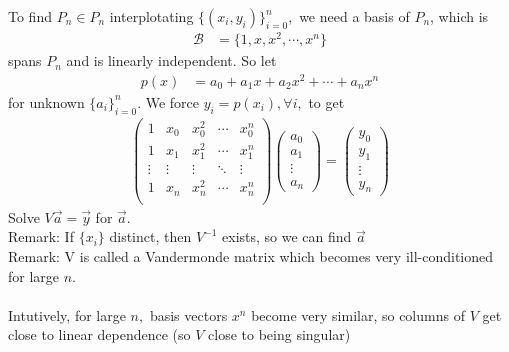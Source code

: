 \documentclass[11pt,oneside]{book}
\theoremstyle{break}
\theoremstyle{break}
\newcommand{\remark}{\color{blue}Remark: \color{black}}
\begin{document}
To find $P_n\in P_n$ interplotating $\{(x_i,y_i)\}^n_{i=0},$ we need a basis of $P_n$, which is \begin{align*}
\mathcal{B}&=\{1,x,x^2,\cdots,x^n\}
\end{align*}
spans $P_n$ and is linearly independent.  So let \begin{align*}
p(x)&=a_0+a_1x+a_2x^2+\cdots+a_nx^n
\end{align*}
for unknown $\{a_i\}^n_{i=0}$. We force $y_i=p(x_i),\forall i,$ to get \begin{align*}
\begin{pmatrix}
1 &x_0&x_0^2&\cdots&x_0^n\\
1 &x_1&x_1^2&\cdots&x_1^n\\
\vdots &\vdots&\vdots&\ddots &\vdots\\
1 &x_n&x_n^2&\cdots&x_n^n\\
\end{pmatrix}
\begin{pmatrix}
a_0\\
a_1\\
\vdots\\
a_n
\end{pmatrix}=\begin{pmatrix}
y_0\\
y_1\\
\vdots\\
y_n
\end{pmatrix}
\end{align*}
Solve $V\vec{a}=\vec{y}$ for $\vec{a}.$\\
\remark If $\{x_i\}$ distinct, then $V^{-1}$ exists, so we can find $\vec{a}$\\
\remark V is called a Vandermonde matrix which becomes very ill-conditioned for large $n.$\\
\hfill\\
Intutively, for large $n,$ basis vectors $x^n$ become very similar, so columns of $V$ get close to linear dependence (so $V$ close to being singular)
\end{document}
